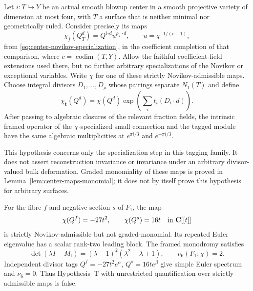 \begin{hypothesisT}
Let \(i:T\hookrightarrow Y\) be an actual smooth blowup center in a smooth
projective variety of dimension at most four, with \(T\) a surface that is
neither minimal nor geometrically ruled. Consider precisely its maps
\[
 \chi_j(Q_T^d)=Q^{i_*d}u^{\rho_T\cdot d},\qquad u=q^{-1/(c-1)},
\]
from \eqref{eq:center-novikov-specialization}, in the coefficient completion
of that comparison, where \(c=\operatorname{codim}(T,Y)\). Allow the
faithful coefficient-field extensions used there, but no further arbitrary
specializations of the Novikov or exceptional variables. Write \(\chi\)
for one of these strictly Novikov-admissible maps. Choose integral
divisors $D_1,\ldots,D_\rho$ whose pairings separate $N_1(T)$ and define
\[
 \chi_{\boldsymbol t}(Q^d)
 =\chi(Q^d)\exp\left(\sum_i t_i(D_i\cdot d)\right).
\]
After passing to algebraic closures of the relevant fraction fields, the
intrinsic framed operator of the $\chi$-specialized small connection and
the tagged module have the same algebraic multiplicities at
$e^{\pi i/3}$ and $e^{-\pi i/3}$.

This hypothesis concerns only the specialization step in this tagging
family.  It does not assert reconstruction invariance or invariance under
an arbitrary divisor-valued bulk deformation. Graded monomiality of these
maps is proved in Lemma~\ref{lem:center-maps-monomial}; it does not by itself
prove this hypothesis for arbitrary surfaces.
\end{hypothesisT}

\begin{proposition}
\label{prop:f1-tagging-counterexample}
%
%
For the fibre \(f\) and negative section \(s\) of \(F_1\), the map
\[
 \chi(Q^f)=-27t^2,\qquad \chi(Q^s)=16t
 \quad\text{in }\mathbf C[[t]]
\]
is strictly Novikov-admissible but not graded-monomial. Its repeated Euler
eigenvalue has a scalar rank-two leading block. The framed monodromy satisfies
\begin{equation}
 \det(\lambda I-M_{\mathrm f})
  =(\lambda-1)^2(\lambda^2-\lambda+1),\qquad \nu_6(F_1;\chi)=2.
 \label{eq:f1-specialized-monodromy}
\end{equation}
Independent divisor tags \(Q^f=-27t^2e^\alpha\), \(Q^s=16te^\beta\)
give simple Euler spectrum and \(\nu_6=0\). Thus Hypothesis~T with
unrestricted quantification over strictly admissible maps is false.
\end{proposition}

